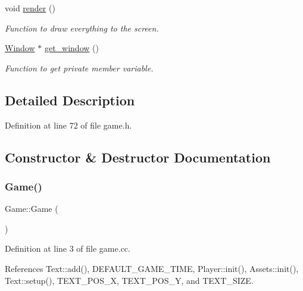 \begin{DoxyCompactItemize}
void \hyperlink{class_game_a15ddd769261d923827a3cdf41499c843}{render} ()
\begin{DoxyCompactList}\small\item\em Function to draw everything to the screen. \end{DoxyCompactList}\item 
\hyperlink{class_window}{Window} $\ast$ \hyperlink{class_game_ada27344ddafc8489f4d6ab5ec6cd9a8e}{get\+\_\+window} ()
\begin{DoxyCompactList}\small\item\em Function to get private member variable. \end{DoxyCompactList}\end{DoxyCompactItemize}


\subsection{Detailed Description}


Definition at line 72 of file game.\+h.



\subsection{Constructor \& Destructor Documentation}
\mbox{\label{class_game_ad59df6562a58a614fda24622d3715b65}} 
\subsubsection{\texorpdfstring{Game()}{Game()}}
{\footnotesize\ttfamily Game\+::\+Game (\begin{DoxyParamCaption}{ }\end{DoxyParamCaption})}



Definition at line 3 of file game.\+cc.



References Text\+::add(), D\+E\+F\+A\+U\+L\+T\+\_\+\+G\+A\+M\+E\+\_\+\+T\+I\+ME, Player\+::init(), Assets\+::init(), Text\+::setup(), T\+E\+X\+T\+\_\+\+P\+O\+S\+\_\+X, T\+E\+X\+T\+\_\+\+P\+O\+S\+\_\+Y, and T\+E\+X\+T\+\_\+\+S\+I\+ZE.


